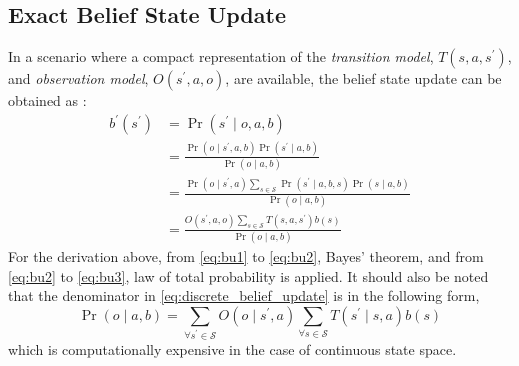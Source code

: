 \subsection{Exact Belief State Update}
\label{sec:exact_update}
In a scenario where a compact representation of the \textit{transition model}, $ T(s, a, s^{\prime})$,  and \textit{observation model}, $ O(s^{\prime}, a, o) $, are available, the belief state update can be obtained as \cite{KAELBLING199899}:
\begin{align}
b^{\prime}\left(s^{\prime}\right) &=\operatorname{Pr}\left(s^{\prime} \mid o, a, b\right) \label{eq:bu1}\\
&=\frac{\operatorname{Pr}\left(o \mid s^{\prime}, a, b\right) \operatorname{Pr}\left(s^{\prime} \mid a, b\right)}{\operatorname{Pr}(o \mid a, b)} \label{eq:bu2}\\
&=\frac{\operatorname{Pr}\left(o \mid s^{\prime}, a\right) \sum_{s \in \mathcal{S}} \operatorname{Pr}\left(s^{\prime} \mid a, b, s\right) \operatorname{Pr}(s \mid a, b)}{\operatorname{Pr}(o \mid a, b)}  \label{eq:bu3}\\
&=\frac{O\left(s^{\prime}, a, o\right) \sum_{s \in \mathcal{S}} T\left(s,a, s^{\prime}\right) b(s)}{\operatorname{Pr}(o \mid a, b)} 
\label{eq:discrete_belief_update}
\end{align}
For the derivation above, from \autoref{eq:bu1} to \autoref{eq:bu2}, Bayes' theorem, and from \autoref{eq:bu2} to \autoref{eq:bu3}, law of total probability is applied. It should also be noted that the denominator in \autoref{eq:discrete_belief_update} is in the following form, 
\begin{equation}
\operatorname{Pr}(o \mid a, b) = \sum_{\forall s^{\prime} \in \mathcal{S}} O(o \mid s^{\prime}, a) \sum_{\forall s \in \mathcal{S}} T(s^{\prime}\mid s,a) b(s)
\label{eq:nasty_denom}
\end{equation}
which is computationally expensive in the case of continuous state space.
